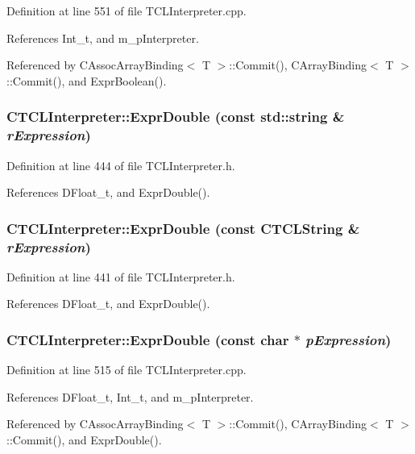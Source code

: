 Definition at line 551 of file TCLInterpreter.cpp.

References Int\_\-t, and m\_\-p\-Interpreter.

Referenced by CAssoc\-Array\-Binding$<$ T $>$::Commit(), CArray\-Binding$<$ T $>$::Commit(), and Expr\-Boolean().
\subsubsection{ CTCLInterpreter::Expr\-Double (const std::string \& {\em r\-Expression})\hspace{0.3cm}{\tt  [inline]}}\label{classCTCLInterpreter_a25}




Definition at line 444 of file TCLInterpreter.h.

References DFloat\_\-t, and Expr\-Double().
\subsubsection{ CTCLInterpreter::Expr\-Double (const {\bf CTCLString} \& {\em r\-Expression})\hspace{0.3cm}{\tt  [inline]}}\label{classCTCLInterpreter_a24}




Definition at line 441 of file TCLInterpreter.h.

References DFloat\_\-t, and Expr\-Double().
\subsubsection{ CTCLInterpreter::Expr\-Double (const char $\ast$ {\em p\-Expression})}\label{classCTCLInterpreter_a23}




Definition at line 515 of file TCLInterpreter.cpp.

References DFloat\_\-t, Int\_\-t, and m\_\-p\-Interpreter.

Referenced by CAssoc\-Array\-Binding$<$ T $>$::Commit(), CArray\-Binding$<$ T $>$::Commit(), and Expr\-Double().
